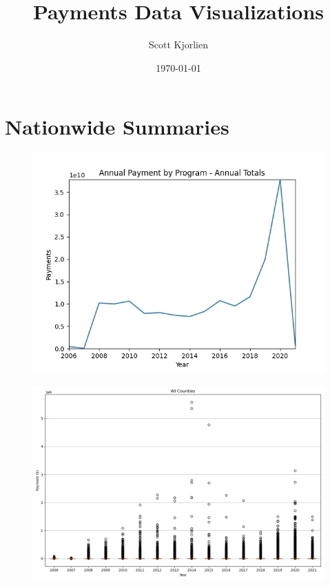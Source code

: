 \documentclass{article}
\title{Payments Data Visualizations}
\author{Scott Kjorlien}
\date{\today}
\begin{document}
\maketitle

\section*{Nationwide Summaries}
\begin{figure}[h]
    \centering
    \includegraphics[width=7in]{../output/plot_annualTrend_Annual Totals.png}
\end{figure}

\newpage
\begin{figure}[h]
    \centering
    \includegraphics[width=7in]{../output/boxplots/counties/All Counties-None_boxplot.png}
\end{figure}
\end{document}
